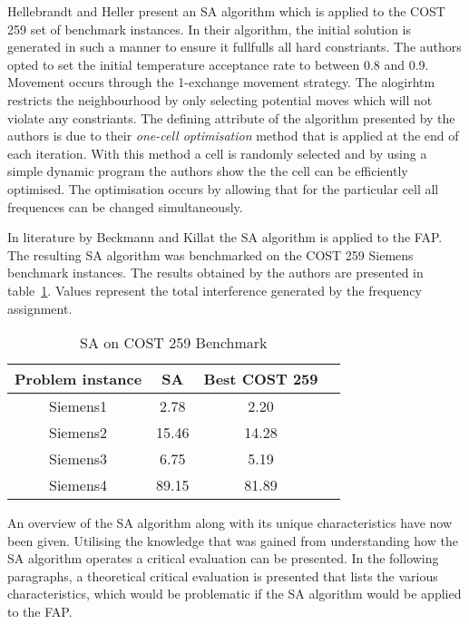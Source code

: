 Hellebrandt and Heller \cite{Hehe00} present an \gls{SA} algorithm which is applied to the COST 259 set of benchmark instances. In their algorithm, the initial solution is generated in such a manner to ensure it fullfulls all hard constriants. The authors opted to set the initial temperature acceptance rate to between 0.8 and 0.9. Movement occurs through the 1-exchange movement strategy. The alogirhtm restricts the neighbourhood by only selecting potential moves which will not violate any constriants. The defining attribute of the algorithm presented by the authors is due to their \emph{one-cell optimisation} method that is applied at the end of each iteration. With this method a cell is randomly selected and by using a simple dynamic program the authors show the the cell can be efficiently optimised. The optimisation occurs by allowing that for the particular cell all frequences can be changed simultaneously\cite{Hehe00}. 

In literature by Beckmann and Killat\cite{BeKi99a} the \gls{SA} algorithm is applied to the \gls{FAP}. The resulting \gls{SA} algorithm was benchmarked on the \gls{COST} 259 Siemens benchmark instances. The results obtained by the authors are presented in table~\ref{tab:SA}. Values represent the total interference generated by the frequency assignment. 

\begin{table}[H]
\centering
	\begin{tabular}{| c | c | c | c |}
	\hline
	Problem instance & \gls{SA} & Best \gls{COST} 259 \\ \hline
	Siemens1 & 2.78 & 2.20\\ \hline
	Siemens2 & 15.46 & 14.28\\ \hline
	Siemens3 & 6.75 & 5.19\\ \hline
	Siemens4 & 89.15 & 81.89\\ \hline
	\end{tabular}
\caption{SA on \gls{COST} 259 Benchmark}
\label{tab:SA}
\end{table}

An overview of the \gls{SA} algorithm along with its unique characteristics have now been given. Utilising the knowledge that was gained from understanding how the \gls{SA} algorithm operates a critical evaluation can be presented. In the following paragraphs, a theoretical critical evaluation is presented that lists the various characteristics, which would be problematic if the \gls{SA} algorithm would be applied to the \gls{FAP}.

